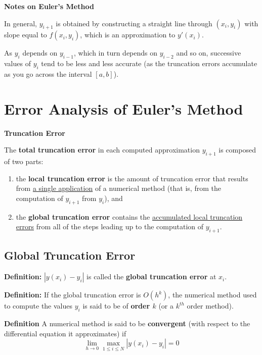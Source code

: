 \documentclass [titlepage,12pt,letter] {article}
\begin{document}
{\bf Notes on Euler's Method}

In general, $y_{i+1}$ is obtained by constructing a straight line through $(x_i,y_i)$ with slope equal to $f(x_i,y_i)$, which is an approximation to $y'(x_i)$.

\vspace{\baselineskip}

As $y_i$ depends on $y_{i-1}$, which in turn depends on $y_{i-2}$ and so on, successive values of $y_i$ tend to be less and less accurate (as the truncation errors accumulate as you go across the interval $[a,b]$).

\section{Error Analysis of Euler's Method}

{\bf Truncation Error}

The {\bf total truncation error} in each computed approximation $y_{i+1}$ is composed of two parts:
\begin{enumerate}
\item{the {\bf local truncation error} is the amount of truncation error that results from \underline{a single application} of a numerical method (that is, from the computation of $y_{i+1}$ from $y_i$), and}
\item{the {\bf global truncation error} contains the \underline{accumulated local truncation errors} from all of the steps leading up to the computation of $y_{i+1}$.}
\end{enumerate}

\subsection{Global Truncation Error}

{\bf Definition:} $|y(x_i)-y_i|$ is called the {\bf global truncation error} at $x_i$.

\vspace{\baselineskip}

{\bf Definition:} If the global truncation error is $O(h^k)$, the numerical method used to compute the values $y_i$ is said to be of {\bf order $k$} (or a $k^{th}$ order method).

\vspace{\baselineskip}

{\bf Definition} A numerical method is said to be {\bf convergent} (with respect to the differential equation it approximates) if
\[
\lim_{h\to0} \max_{1 \leq i \leq N} |y(x_i)-y_i|=0
\]
\end{document}

